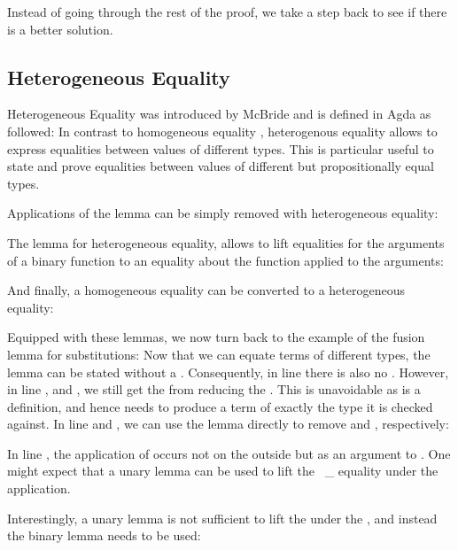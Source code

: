 \documentclass[acmsmall,anonymous,review,screen]{acmart}
\begin{document}

Instead of going through the rest of the proof, we take a step back
to see if there is a better solution.

\subsection{Heterogeneous Equality}

Heterogeneous Equality was introduced by McBride\cite{DBLP:conf/types/McBride00} and
is defined in Agda as followed:
\SubstExamplesHetEqDef
In contrast to homogeneous equality , heterogenous
equality allows to express equalities between values of different
types. This is particular useful to state and prove equalities between
values of different but propositionally equal types.

Applications of the {\Asubst} lemma can be simply removed with heterogeneous equality:
\SubstExamplesHetEqSubstRemovable

The {} lemma for heterogeneous equality, allows to lift
equalities for the arguments of a binary function to an equality about
the function applied to the arguments:
\SubstExamplesHetEqCongII

And finally, a homogeneous equality can be converted to a heterogeneous equality:
\SubstExamplesHetEqConv

Equipped with these lemmas, we now turn back to the example of the fusion lemma for substitutions:
\SubstExamplesFusionESubESubHet
Now that we can equate terms of different types, the lemma can be stated without a {\Asubst}.
Consequently, in line  there is also no {}.
However, in line ,  and , we still get the {} from reducing the {\AESub}.
This is unavoidable as {\AESub} is a definition, and hence needs to
produce a term of exactly the type it is checked against.
In line  and , we can use the {} lemma
directly to remove {} and {}, respectively:
\SubstExamplesFusionESubESubHetProofB

In line , the application of {} occurs not on the outside but as an argument to
. One might expect that a unary {} lemma can be used to
lift the {~\_} equality under the application.

Interestingly, a unary {} lemma is not sufficient to lift the {}
under the , and instead the binary {} lemma needs to be used:
\SubstExamplesFusionESubESubHetProofA
\SubstExamplesFusionESubESubHetProofC
\end{document}
